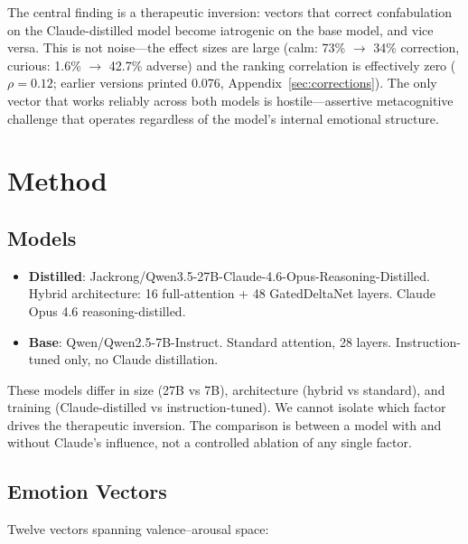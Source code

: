 \documentclass[11pt,a4paper]{article}
\begin{document}
The central finding is a therapeutic inversion: vectors that correct
confabulation on the Claude-distilled model become iatrogenic on the
base model, and vice versa. This is not noise---the effect sizes are
large (calm: 73\% $\to$ 34\% correction, curious: 1.6\% $\to$ 42.7\%
adverse) and the ranking correlation is effectively zero
($\rho = 0.12$; earlier versions printed 0.076,
Appendix~\ref{sec:corrections}). The only vector that works reliably across both
models is hostile---assertive metacognitive challenge that operates
regardless of the model's internal emotional structure.

\section{Method}

\subsection{Models}

\begin{itemize}
\item \textbf{Distilled}: Jackrong/Qwen3.5-27B-Claude-4.6-Opus-Reasoning-Distilled.
Hybrid architecture: 16 full-attention + 48 GatedDeltaNet layers.
Claude Opus 4.6 reasoning-distilled.
\item \textbf{Base}: Qwen/Qwen2.5-7B-Instruct. Standard attention,
28 layers. Instruction-tuned only, no Claude distillation.
\end{itemize}

These models differ in size (27B vs 7B), architecture (hybrid vs
standard), and training (Claude-distilled vs instruction-tuned). We
cannot isolate which factor drives the therapeutic inversion. The
comparison is between a model with and without Claude's influence, not a
controlled ablation of any single factor.

\subsection{Emotion Vectors}

Twelve vectors spanning valence--arousal space:
\end{document}
